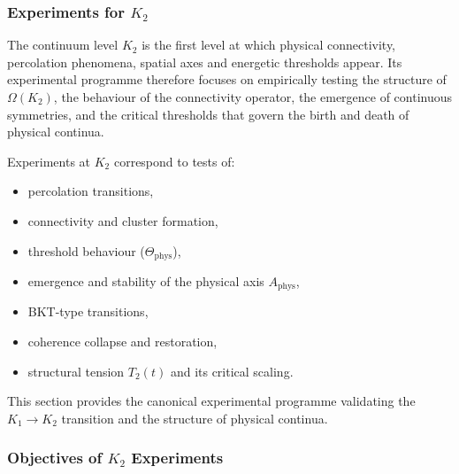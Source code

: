 
\subsubsection{Experiments for \texorpdfstring{$K_2$}{K_2}}
\label{sec:experiments-k2}

The continuum level $K_2$ is the first level at which physical connectivity,
percolation phenomena, spatial axes and energetic thresholds appear.  
Its experimental programme therefore focuses on empirically testing the 
structure of $\Omega(K_2)$, the behaviour of the connectivity operator, 
the emergence of continuous symmetries, and the critical thresholds that 
govern the birth and death of physical continua.

Experiments at $K_2$ correspond to tests of:
\begin{itemize}
    \item percolation transitions,
    \item connectivity and cluster formation,
    \item threshold behaviour ($\Theta_{\mathrm{phys}}$),
    \item emergence and stability of the physical axis $A_{\mathrm{phys}}$,
    \item BKT-type transitions,
    \item coherence collapse and restoration,
    \item structural tension $T_2(t)$ and its critical scaling.
\end{itemize}

This section provides the canonical experimental programme validating the 
$K_1 \rightarrow K_2$ transition and the structure of physical continua.



\subsubsection{Objectives of \texorpdfstring{$K_2$}{K_2} Experiments}

